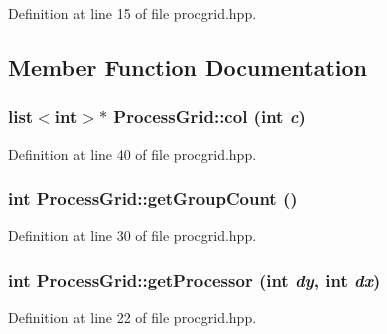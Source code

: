 Definition at line 15 of file procgrid.hpp.

\subsection{Member Function Documentation}
\hypertarget{class_process_grid_af3a44653f3cfacc1ddaa6e8eb58c2d65}{
\subsubsection[{col}]{\setlength{\rightskip}{0pt plus 5cm}list$<$int$>$$\ast$ ProcessGrid::col (int {\em c})}}
\label{class_process_grid_af3a44653f3cfacc1ddaa6e8eb58c2d65}


Definition at line 40 of file procgrid.hpp.\hypertarget{class_process_grid_ab33a60ab0d012f1c36d8a8f8f631d89c}{
\subsubsection[{getGroupCount}]{\setlength{\rightskip}{0pt plus 5cm}int ProcessGrid::getGroupCount ()}}
\label{class_process_grid_ab33a60ab0d012f1c36d8a8f8f631d89c}


Definition at line 30 of file procgrid.hpp.\hypertarget{class_process_grid_a26a8d106c761c8989309b8ca4fed0e7a}{
\subsubsection[{getProcessor}]{\setlength{\rightskip}{0pt plus 5cm}int ProcessGrid::getProcessor (int {\em dy}, \/  int {\em dx})}}
\label{class_process_grid_a26a8d106c761c8989309b8ca4fed0e7a}


Definition at line 22 of file procgrid.hpp.

